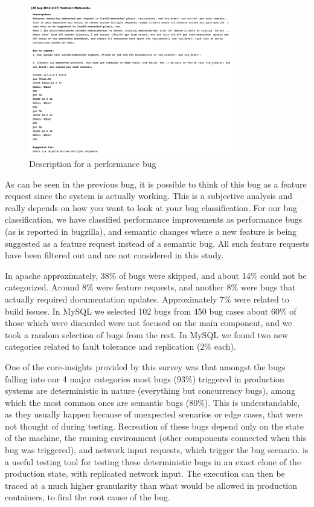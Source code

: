 \begin{figure}
	\begin{center}
		\includegraphics[width=0.8\textwidth]{parikshan/figs/performancedesc}
		\caption{Description for a performance bug}
		\label{fig:perfcomments}
	\end{center}
\end{figure}

As can be seen in the previous bug, it is possible to think of this bug as a feature request since the system is actually working. This is a subjective analysis and really depends on how you want to look at your bug classification. For our bug classification, we have classified performance improvements as performance bugs (as is reported in bugzilla), and semantic changes where a new feature is being suggested as a feature request instead of a semantic bug. All such feature requests have been filtered out and are not considered in this study.


In apache approximately, 38\% of bugs were skipped, and about 14\% could not be categorized. Around 8\% were feature requests, and another 8\% were bugs that actually required documentation updates. Approximately 7\% were related to build issues. In MySQL we selected 102 bugs from 450 bug cases about 60\% of those which were discarded were not focused on the main component, and we took a random selection of bugs from the rest. In MySQL we found two new categories related to fault tolerance and replication (2\% each).


One of the core-insights provided by this survey was that amongst the bugs falling into our 4 major categories most bugs (93\%) triggered in production systems are deterministic in nature (everything but concurrency bugs), among which the most common ones are semantic bugs (80\%).
This is understandable, as they usually happen because of unexpected scenarios or edge cases, that were not thought of during testing.
Recreation of these bugs depend only on the state of the machine, the running environment (other components connected when this bug was triggered), and network input requests, which trigger the bug scenario.
\parikshan is a useful testing tool for testing these deterministic bugs in an exact clone of the production state, with replicated network input. 
The execution can then be traced at a much higher granularity than what would be allowed in production containers, to find the root cause of the bug. 


